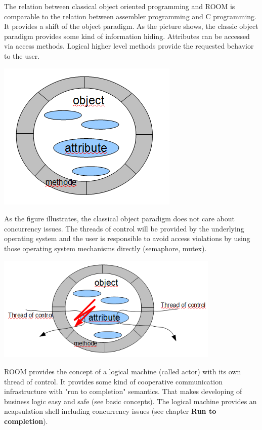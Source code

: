 The relation between classical object oriented programming and ROOM is comparable to the relation between assembler
programming and C programming. It provides a shift of the object paradigm. As the picture shows, the classic object
paradigm provides some kind of information hiding. Attributes can be accessed via access methods. Logical higher level
methods provide the requested behavior to the user.   

\includegraphics{images/010-RoomIntroduction01.png}

As the figure illustrates, the classical object paradigm does not care about concurrency issues. The threads of
control will be provided by the underlying operating system and the user is responsible to avoid access violations
by using those operating system mechanisms directly (semaphore, mutex).

\includegraphics[width=0.8\textwidth]{images/010-RoomIntroduction02.png}

ROOM provides the concept of a logical machine (called actor) with its own thread of control. It provides some kind
of cooperative communication infrastructure with "run to completion" semantics.
That makes developing of business logic easy and safe (see basic concepts). The logical machine provides an 
ncapsulation shell including concurrency issues (see chapter \textbf{Run to completion}). 

